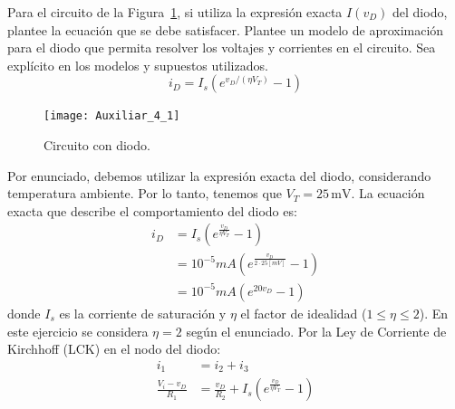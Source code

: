 \documentclass[
  11pt,
  letterpaper,
   addpoints,
  ]{exam}
\begin{document}
\begin{questions}
\question
Para el circuito de la Figura~\ref{fig:1}, si utiliza la expresión exacta $I(v_D)$ del diodo, plantee la ecuación que se debe satisfacer. Plantee un modelo de aproximación para el diodo que permita resolver los voltajes y corrientes en el circuito. Sea explícito en los modelos y supuestos utilizados.
\begin{equation}
  i_D = I_s \left( e^{v_D/(\eta V_T)} - 1 \right)
\end{equation}

\begin{figure}[H]
    \centering
    \texttt{[image: Auxiliar\_4\_1]}
    \caption{Circuito con diodo.}
    \label{fig:1}
\end{figure}
\begin{solution}
Por enunciado, debemos utilizar la expresión exacta del diodo, considerando temperatura ambiente. Por lo tanto, tenemos que $V_{T}=25\,\mathrm{mV}$. La ecuación exacta que describe el comportamiento del diodo es:
\begin{align}
    i_D &= I_s\left(e^{\frac{v_D}{\eta V_T}} - 1\right) \label{eq:shockley}\\
    &= 10^{-5}mA\left(e^{\frac{v_D}{2 \cdot 25[mV]}} - 1\right)\\
    &=10^{-5}mA(e^{20v_{D}}-1)
\end{align}
donde $I_s$ es la corriente de saturación y $\eta$ el factor de idealidad ($1 \leq \eta \leq 2$). En este ejercicio se considera $\eta = 2$ según el enunciado. Por la Ley de Corriente de Kirchhoff (LCK) en el nodo del diodo:
\begin{align}
    i_1 &= i_2 + i_3 \\
\frac{V_i - v_D}{R_1} &= \frac{v_D}{R_2} + I_s\left(e^{\frac{v_D}{\eta V_T}} - 1\right) \label{eq:kcl}
\end{align}
 

\end{solution}
\end{questions}
\end{document}
